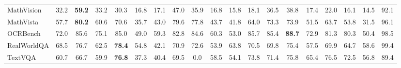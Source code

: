 \documentclass[10pt,twocolumn,letterpaper]{article}
\begin{document}
\begin{table}[t]
\begin{tabular}{lcccccccccccccccccc}
MathVision & 32.2 & \textbf{59.2} & 33.2 & 30.3 & 16.8 & 17.1 & 47.0 & 35.9 & 16.8 & 15.8 & 18.1 & 36.5 & 38.8 & 17.4 & 22.0 & 16.1 & 14.5 & 92.1 \\
MathVista & 57.7 & \textbf{80.2} & 60.6 & 70.6 & 35.7 & 43.0 & 79.6 & 77.8 & 43.7 & 41.8 & 64.0 & 73.3 & 73.9 & 51.5 & 63.7 & 53.8 & 31.5 & 96.1 \\
OCRBench & 72.0 & 85.6 & 75.1 & 85.0 & 49.0 & 59.3 & 82.8 & 84.6 & 60.3 & 53.0 & 85.7 & 85.4 & \textbf{88.7} & 72.9 & 81.3 & 80.3 & 50.4 & 98.5 \\
RealWorldQA & 68.5 & 76.7 & 62.5 & \textbf{78.4} & 54.8 & 42.1 & 70.9 & 72.6 & 53.9 & 63.8 & 70.5 & 69.8 & 75.4 & 57.5 & 69.9 & 64.7 & 58.6 & 99.4 \\
TextVQA & 60.7 & 66.7 & 59.9 & \textbf{76.8} & 37.3 & 40.4 & 69.5 & 0.0 & 58.5 & 54.1 & 73.8 & 71.4 & 75.8 & 65.4 & 76.5 & 72.5 & 56.8 & 89.4 \\
\bottomrule
\end{tabular}
\end{table}
\end{document}
